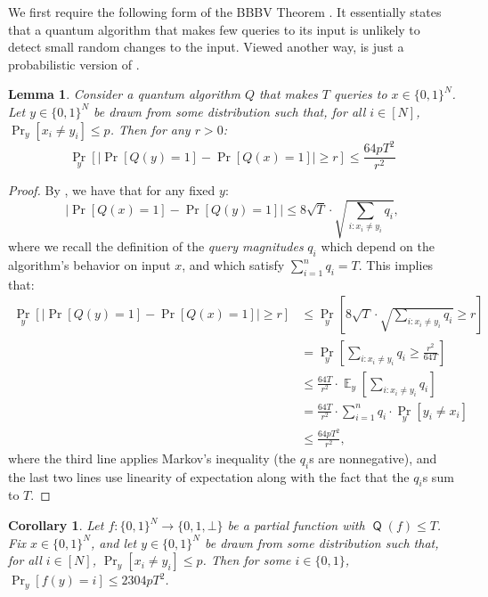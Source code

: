 \documentclass[11pt]{article}%
\newtheorem{corollary}[theorem]{Corollary}
\newtheorem{lemma}[theorem]{Lemma}
\newcommand{\E}{\mathop{\mathbb{E}}}
\DeclareMathOperator{\Q}{\mathsf{Q}}
\begin{document}
We first require the following form of the BBBV Theorem \cite{BBBV97}. It essentially states that a quantum algorithm that makes few queries to its input is unlikely to detect small random changes to the input. Viewed another way,  is just a probabilistic version of .

\begin{lemma}
\label{lem:average_case_bbbv}
Consider a quantum algorithm $Q$ that makes $T$ queries to $x \in \{0,1\}^N$. Let $y \in \{0,1\}^N$ be drawn from some distribution such that, for all $i \in [N]$, $\Pr_{y}\left[x_i \neq y_i\right] \le p$. Then for any $r > 0$:
\[
\Pr_{y} \left[ \left|\Pr\left[Q(y) = 1 \right] - \Pr\left[Q(x) = 1 \right] \right| \ge r \right] \le \frac{64pT^2}{r^2}
\]
\end{lemma}
\begin{proof}
By , we have that for any fixed $y$:
\[
\left|\Pr\left[Q(x) = 1 \right] - \Pr\left[Q(y) = 1 \right] \right| \le 8\sqrt{T} \cdot \sqrt{\sum_{i : x_i \neq y_i} q_i},
\]
where we recall the definition of the \textit{query magnitudes} $q_i$ which depend on the algorithm's behavior on input $x$, and which satisfy $\sum_{i=1}^n q_i = T$. This implies that:
\begin{align*}
\Pr_{y} \left[ \left|\Pr\left[Q(y) = 1 \right] - \Pr\left[Q(x) = 1 \right] \right| \ge r \right]
&\le \Pr_{y} \left[8\sqrt{T} \cdot \sqrt{\sum_{i : x_i \neq y_i} q_i} \ge r\right]\\
&= \Pr_{y} \left[\sum_{i : x_i \neq y_i} q_i \ge \frac{r^2}{64T} \right]\\
&\le \frac{64T}{r^2} \cdot \E_{y}\left[\sum_{i : x_i \neq y_i} q_i\right] \\
&= \frac{64T}{r^2} \cdot \sum_{i=1}^n q_i \cdot \Pr_{y}[y_i \neq x_i]\\
&\le \frac{64pT^2}{r^2},
\end{align*}
where the third line applies Markov's inequality (the $q_i$s are nonnegative), and the last two lines use linearity of expectation along with the fact that the $q_i$s sum to $T$.
\end{proof}

\begin{corollary}
\label{cor:average_case_bbbv_function}
Let $f: \{0,1\}^N \to \{0,1,\bot\}$ be a partial function with $\Q(f) \le T$. Fix $x \in \{0,1\}^N$, and let $y \in \{0,1\}^N$ be drawn from some distribution such that, for all $i \in [N]$, $\Pr_{y}\left[x_i \neq y_i\right] \le p$. Then for some $i \in \{0,1\}$, $\Pr_y[f(y) = i] \le 2304pT^2$.
\end{corollary}
\end{document}
